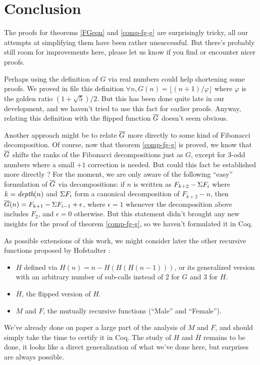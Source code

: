 \documentclass[a4paper,11pt]{article}
\begin{document}
\section{Conclusion}

The proofs for theorems \ref{FGeqn} and \ref{comp-fg-g} are
surprisingly tricky, all our attempts at simplifying them
have been rather unsuccessful. But there's probably still room
for improvements here, please let us know if you find or
encounter nicer proofs.

Perhaps using the definition of $G$
via real numbers could help shortening some proofs.
We proved in file  this definition
$\forall n, G(n)=\lfloor (n+1)/\varphi\rfloor$ where $\varphi$
is the golden ratio $(1+\sqrt{5})/2$. But this has been done
quite late in our development, and we haven't tried to use this
fact for earlier proofs. Anyway,
relating this definition with the flipped function $\overline{G}$
doesn't seem obvious.

Another approach might be to relate
$\overline{G}$ more directly to some kind of Fibonacci decomposition.
Of course, now that theorem \ref{comp-fg-g} is proved, we
know that $\overline{G}$ shifts the ranks of the Fibonacci decompositions
just as $G$, except for 3-odd numbers where a small $+1$
correction is needed. But could this fact be established more
directly ? For the moment, we are only aware of the following
``easy'' formulation of $\overline{G}$ via decompositions:
if $n$ is written as $F_{k+2}-\Sigma F_i$ where $k=\textit{depth}(n)$
and $\Sigma F_i$ form a canonical decomposition of $F_{k+2}-n$, then
$\overline{G}(n)=F_{k+1}-\Sigma F_{i-1}+\epsilon$, where $\epsilon=1$ whenever
the decomposition above includes $F_2$, and $\epsilon=0$
otherwise. But this statement didn't brought any new insights
for the proof of theorem \ref{comp-fg-g}, so we haven't formulated
it in Coq.

As possible extensions of this work, we might consider later
the other recursive functions proposed by Hofstadter :
\begin{itemize}
\item $H$ defined via $H(n)=n-H(H(H(n-1)))$, or its generalized
   version with an arbitrary number of sub-calls instead of 2
   for $G$ and 3 for $H$.
\item $\overline{H}$, the flipped version of $H$.
\item $M$ and $F$, the mutually recursive functions (``Male''
and ``Female'').
\end{itemize}
We've already done on paper a large part of the analysis of
$M$ and $F$, and should simply take the time to certify
it in Coq. The study of $H$ and $\overline{H}$ remains to be
done, it looks like a direct generalization of what we've
done here, but surprises are always possible.
\end{document}
